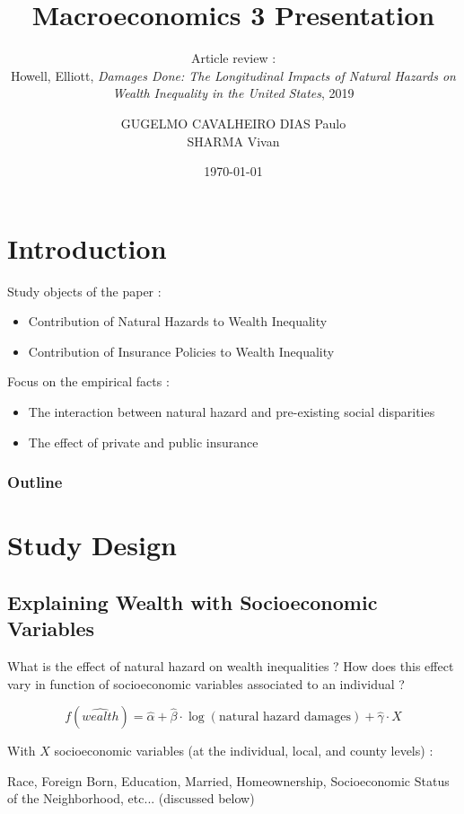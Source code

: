 \documentclass{beamer}
\title{Macroeconomics 3 Presentation}
\subtitle{Article review :  \\ Howell, Elliott, 
\textit{Damages Done: The Longitudinal Impacts of Natural Hazards on Wealth Inequality in the United States}, 2019}
\author{GUGELMO CAVALHEIRO DIAS Paulo \\ SHARMA Vivan}
\institute{Sciences Po}
\date{\today}
\begin{document}
\begin{frame}
    \titlepage
\end{frame}


\section{Introduction}

\begin{frame}{\secname}
    Study objects of the paper : 
    \begin{itemize}
        \item Contribution of Natural Hazards to Wealth Inequality
        \item Contribution of Insurance Policies to Wealth Inequality
    \end{itemize}
    Focus on the empirical facts : 
    \begin{itemize}
        \item The interaction between natural hazard and pre-existing social disparities
        \item The effect of private and public insurance
    \end{itemize}
\end{frame}

\begin{frame}
    \frametitle{Outline}
    \tableofcontents[hideallsubsections]
\end{frame}

\section{Study Design}

\subsection{Explaining Wealth with Socioeconomic Variables}
\begin{frame}{\subsecname}
    What is the effect of natural hazard on wealth inequalities ? 
    How does this effect vary in function of socioeconomic variables associated to an individual ? 

    \begin{equation*}
        f(\widehat{wealth}) = \widehat{\alpha} + \widehat{\beta} \cdot \log(\text{natural hazard damages}) + \widehat{\gamma} \cdot X
    \end{equation*}

    With $X$ socioeconomic variables (at the individual, local, and county levels) :

    Race, Foreign Born, Education, Married, Homeownership, Socioeconomic Status of the Neighborhood, etc...
    (discussed below)
\end{frame}
\end{document}
